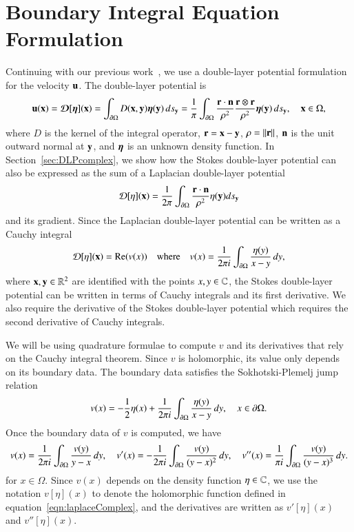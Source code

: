 \documentclass[preprint, 10pt]{elsarticle}
\begin{document}
\section{Boundary Integral Equation Formulation}
\label{s:formulation}
Continuing with our previous work~\cite{qua-moo2018}, we use a
double-layer potential formulation for the velocity ${\mathbf{u}}$.  The
double-layer potential is
\begin{align}
  {\mathbf{u}}({\mathbf{x}}) = {\boldsymbol{\mathcal D}}[{\boldsymbol\eta}]({\mathbf{x}}) = 
    \int_{{\partial}\Omega} D({\mathbf{x}},{\mathbf{y}}) {\boldsymbol\eta}({\mathbf{y}})\, ds_{\mathbf{y}} = 
  \frac{1}{\pi}\int_{{\partial}\Omega} 
    \frac{{\mathbf{r}} \cdot {\mathbf{n}}}{\rho^2} \frac{{\mathbf{r}} \otimes {\mathbf{r}}}{\rho^2}
    {\boldsymbol\eta}({\mathbf{y}}) \, ds_{\mathbf{y}}, \quad {\mathbf{x}} \in \Omega,
  \label{eqn:stokesDLP}
\end{align}
where $D$ is the kernel of the integral operator, ${\mathbf{r}} = {\mathbf{x}} - {\mathbf{y}}$,
$\rho = \|{\mathbf{r}}\|$, ${\mathbf{n}}$ is the unit outward normal at ${\mathbf{y}}$, and ${\boldsymbol\eta}$
is an unknown density function.  In Section~\ref{sec:DLPcomplex}, we
show how the Stokes double-layer potential can also be expressed as the
sum of a Laplacian double-layer potential 
\begin{align}
  {\mathcal{D}}[\eta]({\mathbf{x}}) = \frac{1}{2\pi} \int_{{\partial}\Omega}
    \frac{{\mathbf{r}} \cdot {\mathbf{n}}}{\rho^2} \eta({\mathbf{y}}) ds_{\mathbf{y}}
\end{align}
and its gradient.  Since the Laplacian double-layer potential can be
written as a Cauchy integral
\begin{align}
  {\mathcal{D}}[\eta]({\mathbf{x}}) = {\operatorname{Re}} (v(x)) \quad \text{where} \quad
  v(x) = \frac{1}{2\pi i} \int_{{\partial}\Omega}
    \frac{\eta(y)}{x - y} \, dy,
  \label{eqn:laplaceComplex}
\end{align}
where ${\mathbf{x}},{\mathbf{y}} \in {\mathbb{R}}^2$ are identified with the points $x,y \in {\mathbb{C}}$,
the Stokes double-layer potential can be written in terms of Cauchy
integrals and its first derivative.  We also require the derivative of
the Stokes double-layer potential which requires the second derivative
of Cauchy integrals.

We will be using quadrature formulae to compute $v$ and its derivatives
that rely on the Cauchy integral theorem.  Since $v$ is holomorphic, its
value only depends on its boundary data.  The boundary data satisfies
the Sokhotski-Plemelj jump relation
\begin{align}
  \label{eqn:SPrelation}
  v(x) = -\frac{1}{2} \eta(x) + \frac{1}{2\pi i} \int_{{\partial}\Omega}
    \frac{\eta(y)}{x-y}\, dy, \quad x \in {\partial}\Omega.
\end{align}
Once the boundary data of $v$ is computed, we have
\begin{align}
  \label{eqn:cauchy}
  v(x) = \frac{1}{2\pi i}\int_{{\partial}\Omega} 
    \frac{v(y)}{y-x} \,dy, \quad
  v'(x) = -\frac{1}{2\pi i} \int_{{\partial}\Omega}
    \frac{v(y)}{(y-x)^2} \, dy, \quad
  v''(x) = \frac{1}{\pi i} \int_{{\partial}\Omega}
    \frac{v(y)}{(y-x)^3} \, dy.
\end{align}
for $x \in \Omega$.  Since $v(x)$ depends on the density function $\eta
\in {\mathbb{C}}$, we use the notation $v[\eta](x)$ to denote the holomorphic
function defined in equation~\eqref{eqn:laplaceComplex}, and the
derivatives are written as $v'[\eta](x)$ and $v''[\eta](x)$.
\end{document}

